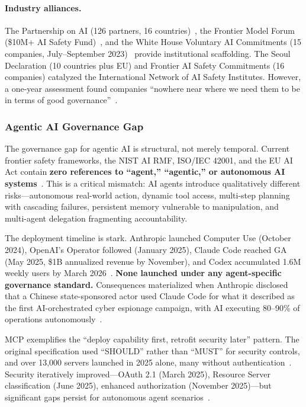 \paragraph{Industry alliances.}
The Partnership on AI (126 partners, 16 countries)~\cite{pai}, the Frontier Model Forum (\$10M+ AI Safety Fund)~\cite{fmf2023}, and the White House Voluntary AI Commitments (15 companies, July--September 2023)~\cite{whitehouse2023commitments} provide institutional scaffolding. The Seoul Declaration (10 countries plus EU) and Frontier AI Safety Commitments (16 companies) catalyzed the International Network of AI Safety Institutes. However, a one-year assessment found companies ``nowhere near where we need them to be in terms of good governance''~\cite{mitreview2024assessment}.


\subsubsection{Agentic AI Governance Gap}
\label{sec:gov-agentic}

The governance gap for agentic AI is structural, not merely temporal. Current frontier safety frameworks, the NIST AI RMF, ISO/IEC 42001, and the EU AI Act contain \textbf{zero references to ``agent,'' ``agentic,'' or autonomous AI systems}~\cite{zenity2025blindspot}. This is a critical mismatch: AI agents introduce qualitatively different risks---autonomous real-world action, dynamic tool access, multi-step planning with cascading failures, persistent memory vulnerable to manipulation, and multi-agent delegation fragmenting accountability.

The deployment timeline is stark. Anthropic launched Computer Use (October 2024), OpenAI's Operator followed (January 2025), Claude Code reached GA (May 2025, \$1B annualized revenue by November), and Codex accumulated 1.6M weekly users by March 2026~\cite{anthropic2024computeruse,openaicopilot}. \textbf{None launched under any agent-specific governance standard.} Consequences materialized when Anthropic disclosed that a Chinese state-sponsored actor used Claude Code for what it described as the first AI-orchestrated cyber espionage campaign, with AI executing 80--90\% of operations autonomously~\cite{anthropic2025gtg1002}.

MCP exemplifies the ``deploy capability first, retrofit security later'' pattern. The original specification used ``SHOULD'' rather than ``MUST'' for security controls, and over 13,000 servers launched in 2025 alone, many without authentication~\cite{zenity2025mcp}. Security iteratively improved---OAuth 2.1 (March 2025), Resource Server classification (June 2025), enhanced authorization (November 2025)---but significant gaps persist for autonomous agent scenarios~\cite{aws2025mcpauth}.

